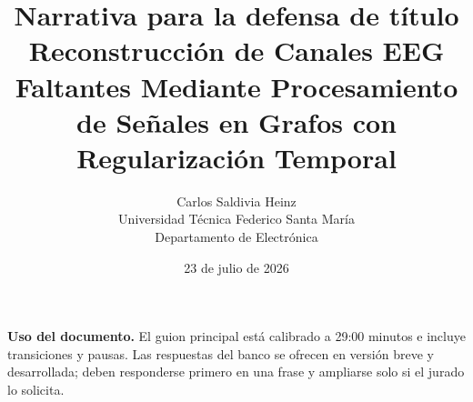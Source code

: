 \documentclass[11pt,a4paper]{article}
\title{\textbf{Narrativa para la defensa de título}\\[0.5em]\large Reconstrucción de Canales EEG Faltantes Mediante Procesamiento de Señales en Grafos con Regularización Temporal}
\author{Carlos Saldivia Heinz\\Universidad Técnica Federico Santa María\\Departamento de Electrónica}
\date{23 de julio de 2026}
\begin{document}
\maketitle
\begin{center}
\colorbox{USMLight}{\parbox{0.90\linewidth}{\textbf{Uso del documento.} El guion principal está calibrado a 29:00 minutos e incluye transiciones y pausas. Las respuestas del banco se ofrecen en versión breve y desarrollada; deben responderse primero en una frase y ampliarse solo si el jurado lo solicita.}}
\end{center}
\tableofcontents
\clearpage

\clearpage

\end{document}
